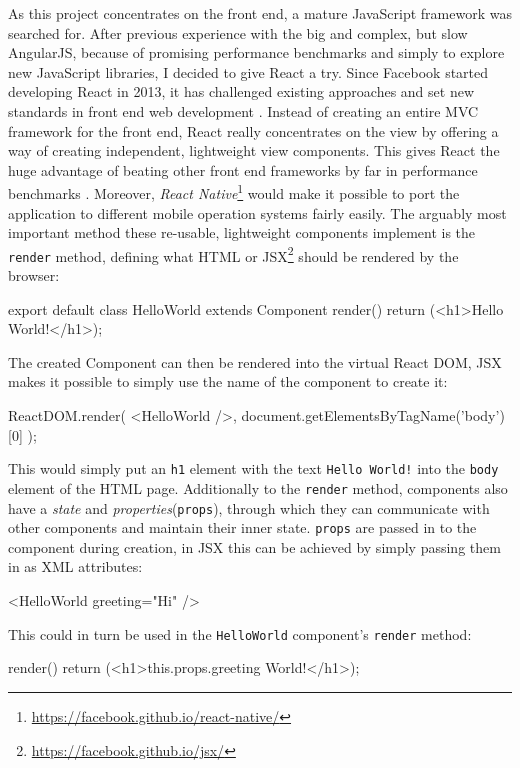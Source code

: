 As this project concentrates on the front end, a mature JavaScript framework was searched for. After previous experience with the big and complex, but slow AngularJS, because of promising performance benchmarks \cite{react-benchmarks} and simply to explore new JavaScript libraries, I decided to give React a try. Since Facebook started developing React in 2013, it has challenged existing approaches and set new standards in front end web development \cite{introduction-to-react}. Instead of creating an entire MVC framework for the front end, React really concentrates on the view by offering a way of creating independent, lightweight view components. This gives React the huge advantage of beating other front end frameworks by far in performance benchmarks \cite{react-benchmarks}. Moreover, \emph{React Native}\footnote{\url{https://facebook.github.io/react-native/}} would make it possible to port the application to different mobile operation systems fairly easily.
The arguably most important method these re-usable, lightweight components implement is the \texttt{render} method, defining what HTML or JSX\footnote{\url{https://facebook.github.io/jsx/}} should be rendered by the browser:
\begin{JsCode}
export default class HelloWorld extends Component {
  render() {
    return (<h1>Hello World!</h1>);
  }
}
\end{JsCode}
%
The created Component can then be rendered into the virtual React DOM, JSX makes it possible to simply use the name of the component to create it:
%
\begin{JsCode}
ReactDOM.render(
  <HelloWorld />,
  document.getElementsByTagName('body')[0]
);
\end{JsCode}
%
This would simply put an \texttt{h1} element with the text \texttt{Hello World!} into the \texttt{body} element of the HTML page. Additionally to the \texttt{render} method, components also have a \emph{state} and \emph{properties}(\texttt{props}), through which they can communicate with other components and maintain their inner state. \texttt{props} are passed in to the component during creation, in JSX this can be achieved by simply passing them in as XML attributes:
%
\begin{JsCode}
  <HelloWorld greeting="Hi" />
\end{JsCode}
%
This could in turn be used in the \texttt{HelloWorld} component's \texttt{render} method:
%
\begin{JsCode}
  render() {
    return (<h1>{this.props.greeting} World!</h1>);
  }
\end{JsCode}
